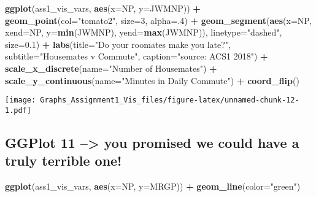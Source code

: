 \documentclass[
]{article}
\newenvironment{Shaded}{\begin{snugshade}}{\end{snugshade}}
\newcommand{\DataTypeTok}[1]{\textcolor[rgb]{0.13,0.29,0.53}{#1}}
\newcommand{\DecValTok}[1]{\textcolor[rgb]{0.00,0.00,0.81}{#1}}
\newcommand{\FloatTok}[1]{\textcolor[rgb]{0.00,0.00,0.81}{#1}}
\newcommand{\KeywordTok}[1]{\textcolor[rgb]{0.13,0.29,0.53}{\textbf{#1}}}
\newcommand{\NormalTok}[1]{#1}
\newcommand{\OperatorTok}[1]{\textcolor[rgb]{0.81,0.36,0.00}{\textbf{#1}}}
\newcommand{\StringTok}[1]{\textcolor[rgb]{0.31,0.60,0.02}{#1}}
\begin{document}
\begin{Shaded}
\begin{Highlighting}[]
\KeywordTok{ggplot}\NormalTok{(ass1_vis_vars, }\KeywordTok{aes}\NormalTok{(}\DataTypeTok{x=}\NormalTok{NP, }\DataTypeTok{y=}\NormalTok{JWMNP)) }\OperatorTok{+}\StringTok{ }
\StringTok{  }\KeywordTok{geom_point}\NormalTok{(}\DataTypeTok{col=}\StringTok{"tomato2"}\NormalTok{, }\DataTypeTok{size=}\DecValTok{3}\NormalTok{, }\DataTypeTok{alpha=}\NormalTok{.}\DecValTok{4}\NormalTok{) }\OperatorTok{+}\StringTok{  }
\StringTok{  }\KeywordTok{geom_segment}\NormalTok{(}\KeywordTok{aes}\NormalTok{(}\DataTypeTok{x=}\NormalTok{NP, }
                   \DataTypeTok{xend=}\NormalTok{NP, }
                   \DataTypeTok{y=}\KeywordTok{min}\NormalTok{(JWMNP), }
                   \DataTypeTok{yend=}\KeywordTok{max}\NormalTok{(JWMNP)), }
               \DataTypeTok{linetype=}\StringTok{"dashed"}\NormalTok{, }
               \DataTypeTok{size=}\FloatTok{0.1}\NormalTok{) }\OperatorTok{+}\StringTok{ }
\StringTok{  }\KeywordTok{labs}\NormalTok{(}\DataTypeTok{title=}\StringTok{"Do your roomates make you late?"}\NormalTok{, }
       \DataTypeTok{subtitle=}\StringTok{"Housemates v Commute"}\NormalTok{, }
       \DataTypeTok{caption=}\StringTok{"source: ACS1 2018"}\NormalTok{) }\OperatorTok{+}\StringTok{  }
\StringTok{  }\KeywordTok{scale_x_discrete}\NormalTok{(}\DataTypeTok{name=}\StringTok{"Number of Housemates"}\NormalTok{) }\OperatorTok{+}
\StringTok{  }\KeywordTok{scale_y_continuous}\NormalTok{(}\DataTypeTok{name=}\StringTok{"Minutes in Daily Commute"}\NormalTok{) }\OperatorTok{+}
\StringTok{  }\KeywordTok{coord_flip}\NormalTok{()}
\end{Highlighting}
\end{Shaded}

\texttt{[image: Graphs\_Assignment1\_Vis\_files/figure-latex/unnamed-chunk-12-1.pdf]}

\hypertarget{ggplot-11-you-promised-we-could-have-a-truly-terrible-one}{%
\subsection{\texorpdfstring{GGPlot 11 --\textgreater{} you promised we
could have a \textbf{truly} terrible
one!}{GGPlot 11 --\textgreater{} you promised we could have a truly terrible one!}}\label{ggplot-11-you-promised-we-could-have-a-truly-terrible-one}}

\begin{Shaded}
\begin{Highlighting}[]
\KeywordTok{ggplot}\NormalTok{(ass1_vis_vars, }\KeywordTok{aes}\NormalTok{(}\DataTypeTok{x=}\NormalTok{NP, }\DataTypeTok{y=}\NormalTok{MRGP)) }\OperatorTok{+}
\StringTok{  }\KeywordTok{geom_line}\NormalTok{(}\DataTypeTok{color=}\StringTok{"green"}\NormalTok{)}
\end{Highlighting}
\end{Shaded}
\end{document}
